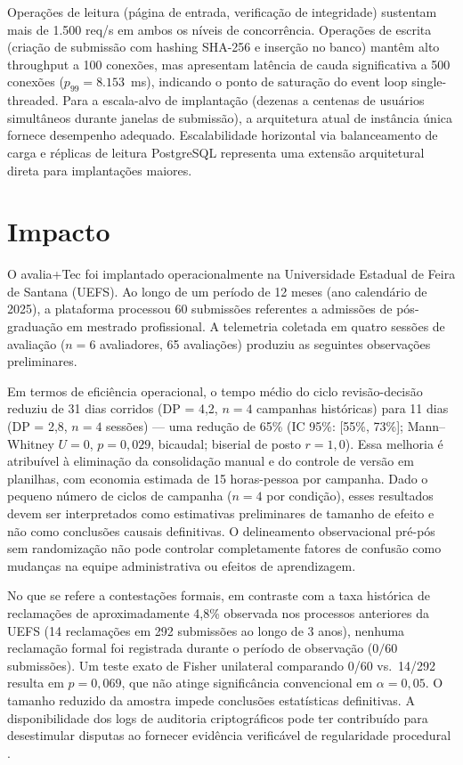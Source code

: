 \documentclass[preprint,12pt,a4paper]{elsarticle}
\begin{document}
Operações de leitura (página de entrada, verificação de integridade) sustentam mais de 1.500 req/s em ambos os níveis de concorrência. Operações de escrita (criação de submissão com hashing SHA-256 e inserção no banco) mantêm alto throughput a 100 conexões, mas apresentam latência de cauda significativa a 500 conexões ($p_{99} = 8.153$~ms), indicando o ponto de saturação do event loop single-threaded. Para a escala-alvo de implantação (dezenas a centenas de usuários simultâneos durante janelas de submissão), a arquitetura atual de instância única fornece desempenho adequado. Escalabilidade horizontal via balanceamento de carga e réplicas de leitura PostgreSQL representa uma extensão arquitetural direta para implantações maiores.

\section{Impacto}

O avalia+Tec foi implantado operacionalmente na Universidade Estadual de Feira de Santana (UEFS). Ao longo de um período de 12 meses (ano calendário de 2025), a plataforma processou 60 submissões referentes a admissões de pós-graduação em mestrado profissional. A telemetria coletada em quatro sessões de avaliação ($n = 6$ avaliadores, 65 avaliações) produziu as seguintes observações preliminares.

Em termos de eficiência operacional, o tempo médio do ciclo revisão-decisão reduziu de 31 dias corridos (DP = 4,2, $n = 4$ campanhas históricas) para 11 dias (DP = 2,8, $n = 4$ sessões) --- uma redução de 65\% (IC 95\%: [55\%, 73\%]; Mann--Whitney $U = 0$, $p = 0{,}029$, bicaudal; biserial de posto $r = 1{,}0$). Essa melhoria é atribuível à eliminação da consolidação manual e do controle de versão em planilhas, com economia estimada de 15 horas-pessoa por campanha. Dado o pequeno número de ciclos de campanha ($n = 4$ por condição), esses resultados devem ser interpretados como estimativas preliminares de tamanho de efeito e não como conclusões causais definitivas. O delineamento observacional pré-pós sem randomização não pode controlar completamente fatores de confusão como mudanças na equipe administrativa ou efeitos de aprendizagem.

No que se refere a contestações formais, em contraste com a taxa histórica de reclamações de aproximadamente 4,8\% observada nos processos anteriores da UEFS (14 reclamações em 292 submissões ao longo de 3 anos), nenhuma reclamação formal foi registrada durante o período de observação ($0/60$ submissões). Um teste exato de Fisher unilateral comparando 0/60 vs.\ 14/292 resulta em $p = 0{,}069$, que não atinge significância convencional em $\alpha = 0{,}05$. O tamanho reduzido da amostra impede conclusões estatísticas definitivas. A disponibilidade dos logs de auditoria criptográficos pode ter contribuído para desestimular disputas ao fornecer evidência verificável de regularidade procedural \citep{Hood2007}.
\end{document}
